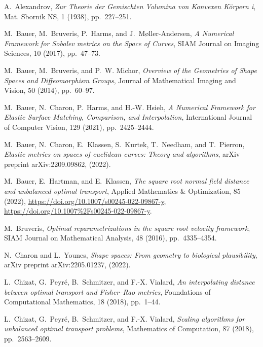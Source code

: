 \documentclass[final,hidelinks,onefignum,onetabnum]{siamart220329}
\begin{document}

\begin{thebibliography}{10}

{\sc A.~Alexandrov}, {\em Zur Theorie der Gemischten Volumina von Konvexen K{\"o}rpern i}, Mat. Sbornik NS, 1 (1938), pp.~227--251.

{\sc M.~Bauer, M.~Bruveris, P.~Harms, and J.~M{\o}ller-Andersen}, {\em A Numerical Framework for Sobolev metrics on the Space of Curves}, SIAM Journal on Imaging Sciences, 10 (2017), pp.~47--73.

{\sc M.~Bauer, M.~Bruveris, and P.~W. Michor}, {\em Overview of the Geometries of Shape Spaces and Diffeomorphism Groups}, Journal of Mathematical Imaging and Vision, 50 (2014), pp.~60--97.

{\sc M.~Bauer, N.~Charon, P.~Harms, and H.-W. Hsieh}, {\em A Numerical Framework for Elastic Surface Matching, Comparison, and Interpolation}, International Journal of Computer Vision, 129 (2021), pp.~2425--2444.

{\sc M.~Bauer, N.~Charon, E.~Klassen, S.~Kurtek, T.~Needham, and T.~Pierron}, {\em Elastic metrics on spaces of euclidean curves: Theory and algorithms}, arXiv preprint arXiv:2209.09862,  (2022).

{\sc M.~Bauer, E.~Hartman, and E.~Klassen}, {\em The square root normal field distance and unbalanced optimal transport}, Applied Mathematics {\&} Optimization, 85 (2022), \url{https://doi.org/10.1007/s00245-022-09867-y}, \url{https://doi.org/10.1007\%2Fs00245-022-09867-y}.

{\sc M.~Bruveris}, {\em Optimal reparametrizations in the square root velocity framework}, SIAM Journal on Mathematical Analysis, 48 (2016), pp.~4335--4354.

{\sc N.~Charon and L.~Younes}, {\em Shape spaces: From geometry to biological plausibility}, arXiv preprint arXiv:2205.01237,  (2022).

{\sc L.~Chizat, G.~Peyr{\'e}, B.~Schmitzer, and F.-X. Vialard}, {\em An interpolating distance between optimal transport and {F}isher--{R}ao metrics}, Foundations of Computational Mathematics, 18 (2018), pp.~1--44.

{\sc L.~Chizat, G.~Peyr{\'e}, B.~Schmitzer, and F.-X. Vialard}, {\em Scaling algorithms for unbalanced optimal transport problems}, Mathematics of Computation, 87 (2018), pp.~2563--2609.


\end{thebibliography}
\end{document}
